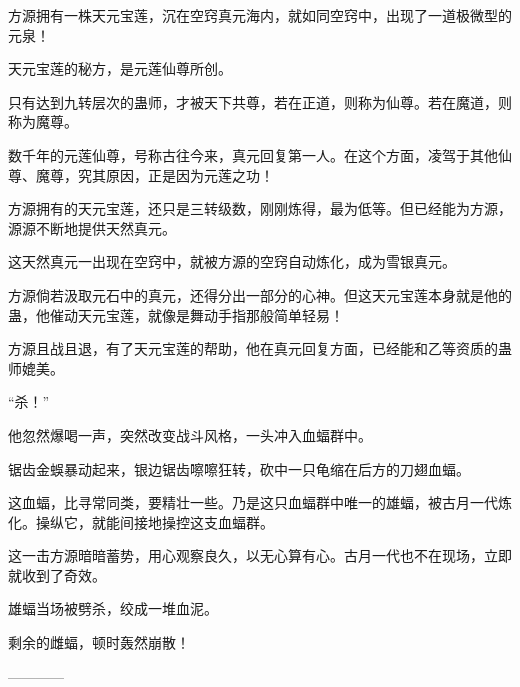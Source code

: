 \begin{this_body}
方源拥有一株天元宝莲，沉在空窍真元海内，就如同空窍中，出现了一道极微型的元泉！

天元宝莲的秘方，是元莲仙尊所创。

只有达到九转层次的蛊师，才被天下共尊，若在正道，则称为仙尊。若在魔道，则称为魔尊。

数千年的元莲仙尊，号称古往今来，真元回复第一人。在这个方面，凌驾于其他仙尊、魔尊，究其原因，正是因为元莲之功！

方源拥有的天元宝莲，还只是三转级数，刚刚炼得，最为低等。但已经能为方源，源源不断地提供天然真元。

这天然真元一出现在空窍中，就被方源的空窍自动炼化，成为雪银真元。

方源倘若汲取元石中的真元，还得分出一部分的心神。但这天元宝莲本身就是他的蛊，他催动天元宝莲，就像是舞动手指那般简单轻易！

方源且战且退，有了天元宝莲的帮助，他在真元回复方面，已经能和乙等资质的蛊师媲美。

“杀！”

他忽然爆喝一声，突然改变战斗风格，一头冲入血蝠群中。

锯齿金蜈暴动起来，银边锯齿嚓嚓狂转，砍中一只龟缩在后方的刀翅血蝠。

这血蝠，比寻常同类，要精壮一些。乃是这只血蝠群中唯一的雄蝠，被古月一代炼化。操纵它，就能间接地操控这支血蝠群。

这一击方源暗暗蓄势，用心观察良久，以无心算有心。古月一代也不在现场，立即就收到了奇效。

雄蝠当场被劈杀，绞成一堆血泥。

剩余的雌蝠，顿时轰然崩散！

------------

\end{this_body}

